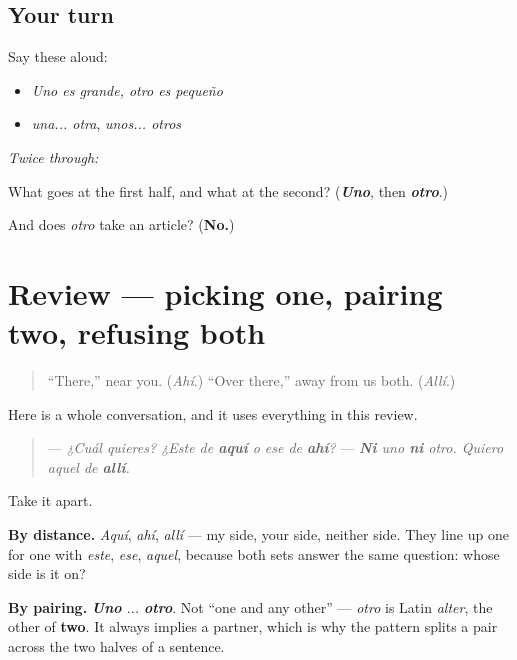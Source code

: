 \subsection*{Your turn}
Say these aloud:

\begin{itemize}
\raggedright
  \item \emph{Uno es grande, otro es pequeño}
  \item \emph{una... otra}, \emph{unos... otros}
\end{itemize}

\emph{Twice through:}

\begin{tcolorbox}[breakable,colback=teal!4,colframe=teal!35!black,title={Before you move on}]
What goes at the first half, and what at the second? (\emph{\textbf{Uno}}, then \emph{\textbf{otro}}.)

And does \emph{otro} take an article? (\textbf{No.})
\end{tcolorbox}
\section[(review)]{Review — picking one, pairing two, refusing both}

\label{lesson:ES-C67-repaso-uno-otro-ninguno}



\begin{quote}
\textquotedblleft{}There,\textquotedblright{} near you. (\emph{Ahí}.) \textquotedblleft{}Over there,\textquotedblright{} away from us both. (\emph{Allí}.)
\end{quote}

\begin{grammarlens}[title={What you've built}]
Here is a whole conversation, and it uses everything in this review.

\begin{quote}
— \emph{¿Cuál quieres? ¿Este de \textbf{aquí} o ese de \textbf{ahí}?} — \emph{\textbf{Ni} uno \textbf{ni} otro. Quiero aquel de \textbf{allí}.}
\end{quote}

Take it apart.

\textbf{By distance.} \emph{Aquí}, \emph{ahí}, \emph{allí} — my side, your side, neither side. They line up one for one with \emph{este}, \emph{ese}, \emph{aquel}, because both sets answer the same question: whose side is it on?

\textbf{By pairing.} \emph{\textbf{Uno}} \emph{... \textbf{otro}}. Not \textquotedblleft{}one and any other\textquotedblright{} — \emph{otro} is Latin \emph{alter}, the other of \textbf{two}. It always implies a partner, which is why the pattern splits a pair across the two halves of a sentence.
\end{grammarlens}

